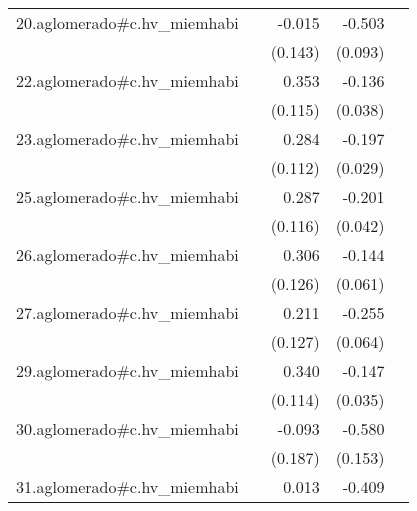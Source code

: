 {\begin{longtable}{l*{4}{D{.}{.}{-1}}}
\addlinespace
20.aglomerado#c.hv\_miemhabi&                     &      -0.015         &      -0.503\sym{***}&                     \\
            &                     &     (0.143)         &     (0.093)         &                     \\
\addlinespace
22.aglomerado#c.hv\_miemhabi&                     &       0.353\sym{**} &      -0.136\sym{***}&                     \\
            &                     &     (0.115)         &     (0.038)         &                     \\
\addlinespace
23.aglomerado#c.hv\_miemhabi&                     &       0.284\sym{*}  &      -0.197\sym{***}&                     \\
            &                     &     (0.112)         &     (0.029)         &                     \\
\addlinespace
25.aglomerado#c.hv\_miemhabi&                     &       0.287\sym{*}  &      -0.201\sym{***}&                     \\
            &                     &     (0.116)         &     (0.042)         &                     \\
\addlinespace
26.aglomerado#c.hv\_miemhabi&                     &       0.306\sym{*}  &      -0.144\sym{*}  &                     \\
            &                     &     (0.126)         &     (0.061)         &                     \\
\addlinespace
27.aglomerado#c.hv\_miemhabi&                     &       0.211         &      -0.255\sym{***}&                     \\
            &                     &     (0.127)         &     (0.064)         &                     \\
\addlinespace
29.aglomerado#c.hv\_miemhabi&                     &       0.340\sym{**} &      -0.147\sym{***}&                     \\
            &                     &     (0.114)         &     (0.035)         &                     \\
\addlinespace
30.aglomerado#c.hv\_miemhabi&                     &      -0.093         &      -0.580\sym{***}&                     \\
            &                     &     (0.187)         &     (0.153)         &                     \\
\addlinespace
31.aglomerado#c.hv\_miemhabi&                     &       0.013         &      -0.409\sym{***}&                     \\

\end{longtable}}
